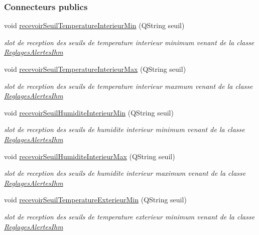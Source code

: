 \subsubsection*{Connecteurs publics}
\begin{DoxyCompactItemize}
\item 
void \hyperlink{class_alertes_a0e5e5177eed435d74bcbdc2a36911e52}{recevoir\+Seuil\+Temperature\+Interieur\+Min} (Q\+String seuil)
\begin{DoxyCompactList}\small\item\em slot de reception des seuils de temperature interieur minimum venant de la classe \hyperlink{class_reglages_alertes_ihm}{Reglages\+Alertes\+Ihm} \end{DoxyCompactList}\item 
void \hyperlink{class_alertes_a06b136f1e86ca97978187305a11be0ff}{recevoir\+Seuil\+Temperature\+Interieur\+Max} (Q\+String seuil)
\begin{DoxyCompactList}\small\item\em slot de reception des seuils de temperature interieur maxmum venant de la classe \hyperlink{class_reglages_alertes_ihm}{Reglages\+Alertes\+Ihm} \end{DoxyCompactList}\item 
void \hyperlink{class_alertes_a4444f527a708f8e1963d2dc1c95bad96}{recevoir\+Seuil\+Humidite\+Interieur\+Min} (Q\+String seuil)
\begin{DoxyCompactList}\small\item\em slot de reception des seuils de humidite interieur minimum venant de la classe \hyperlink{class_reglages_alertes_ihm}{Reglages\+Alertes\+Ihm} \end{DoxyCompactList}\item 
void \hyperlink{class_alertes_a7554e8b6752b0e0a5cfefeecfbc3ba56}{recevoir\+Seuil\+Humidite\+Interieur\+Max} (Q\+String seuil)
\begin{DoxyCompactList}\small\item\em slot de reception des seuils de humidite interieur maximum venant de la classe \hyperlink{class_reglages_alertes_ihm}{Reglages\+Alertes\+Ihm} \end{DoxyCompactList}\item 
void \hyperlink{class_alertes_ad88c760d06e1d438a57027857d50a77f}{recevoir\+Seuil\+Temperature\+Exterieur\+Min} (Q\+String seuil)
\begin{DoxyCompactList}\small\item\em slot de reception des seuils de temperature exterieur minimum venant de la classe \hyperlink{class_reglages_alertes_ihm}{Reglages\+Alertes\+Ihm} \end{DoxyCompactList}\item 

\end{DoxyCompactItemize}
